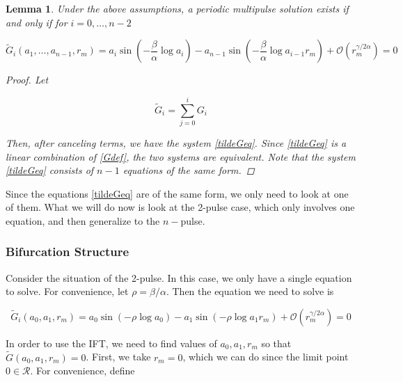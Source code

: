 \documentclass[12pt]{article}
\newtheorem{lemma}{Lemma}
\begin{document}

\begin{lemma}
Under the above assumptions, a periodic multipulse solution exists if and only if for $i = 0, \dots, n-2$

\begin{equation}\label{tildeGeq}
\tilde{G}_i(a_1, \dots, a_{n-1}, r_m) = a_i \sin \left( - \frac{\beta}{\alpha} \log a_i \right) - a_{n-1} \sin \left( - \frac{\beta}{\alpha} \log a_{i-1} r_m \right) + \mathcal{O}(r_m^{\gamma / 2 \alpha}) = 0
\end{equation}

\begin{proof}

Let 

\begin{equation}\label{tildeGdef}
\tilde{G}_i = \sum_{j = 0}^i G_i
\end{equation}

Then, after canceling terms, we have the system \eqref{tildeGeq}. Since \eqref{tildeGeq} is a linear combination of \eqref{Gdef}, the two systems are equivalent. Note that the system \eqref{tildeGeq} consists of $n-1$ equations of the same form.

\end{proof}
\end{lemma}

Since the equations \eqref{tildeGeq} are of the same form, we only need to look at one of them. What we will do now is look at the 2-pulse case, which only involves one equation, and then generalize to the $n-$pulse.

\subsubsection{Bifurcation Structure}

Consider the situation of the 2-pulse. In this case, we only have a single equation to solve. For convenience, let $\rho = \beta / \alpha$. Then the equation we need to solve is

\begin{equation}\label{tildeGeq}
\tilde{G}_i(a_0, a_1, r_m) = a_0 \sin \left( -\rho \log a_0 \right) - a_1 \sin \left( -\rho \log a_1 r_m \right) + \mathcal{O}(r_m^{\gamma / 2 \alpha}) = 0
\end{equation}

In order to use the IFT, we need to find values of $a_0, a_1, r_m$ so that $\tilde{G}(a_0, a_1, r_m) = 0$. First, we take $r_m = 0$, which we can do since the limit point $0 \in \mathcal{R}$. For convenience, define
\end{document}
